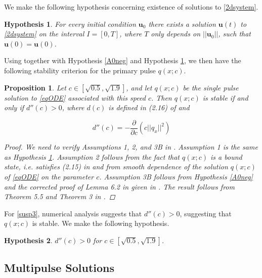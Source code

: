 \documentclass[12pt]{article}
\newtheorem{proposition}{Proposition}
\newtheorem{hypothesis}{Hypothesis}
\begin{document}
We make the following hypothesis concerning existence of solutions to \eqref{2dsystem}.

\begin{hypothesis}\label{existhyp}
For every initial condition $\textbf{u}_0$ there exists a solution $\textbf{u}(t)$ to \eqref{2dsystem} on the interval $I = [0, T]$, where $T$ only depends on $||\textbf{u}_0||$, such that $\textbf{u}(0) = \textbf{u}(0)$. 
\end{hypothesis}

Using \cite{Grillakis1987} together with Hypothesis \ref{A0neg} and Hypothesis \ref{existhyp}, we then have the following stability criterion for the primary pulse $q(x; c)$. 

\begin{proposition}\label{stabcrit}
Let $c \in [\sqrt{0.5}, \sqrt{1.9}]$, and let $q(x; c)$ be the single pulse solution to \eqref{eqODE} associated with this speed $c$. Then $q(x; c)$ is stable if and only if $d''(c) > 0$, where $d(c)$ is defined in (2.16) of \cite{Grillakis1987} and 

\begin{equation}\label{dcc}
d''(c) = -\frac{\partial}{\partial c} \left( c ||q_x||^2 \right)
\end{equation}

\begin{proof}
We need to verify Assumptions 1, 2, and 3B in \cite{Grillakis1987}. Assumption 1 is the same as Hypothesis \ref{existhyp}. Assumption 2 follows from the fact that $q(x; c)$ is a bound state, i.e. satisfies (2.15) in \cite{Grillakis1987} and from smooth dependence of the solution $q(x; c)$ of \eqref{eqODE} on the parameter $c$. Assumption 3B follows from Hypothesis \ref{A0neg} and the corrected proof of Lemma 6.2 in \cite{Grillakis1987} given in \cite{Grillakis1990}. The result follows from Theorem 5.5 and Theorem 3 in \cite{Grillakis1987}.

\end{proof}
\end{proposition}

For \eqref{susp3}, numerical analysis suggests that $d''(c) > 0$, suggesting that $q(x; c)$ is stable. We make the following hypothesis.

\begin{hypothesis}\label{hypdccpos}
$d''(c) > 0$ for $c \in [\sqrt{0.5}, \sqrt{1.9}]$.
\end{hypothesis}

\subsection{Multipulse Solutions}
\end{document}
